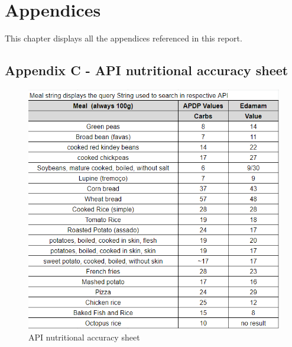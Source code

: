 %
%

\chapter{Appendices}

This chapter displays all the appendices referenced in this report.

\newpage

\appendix


\begin{landscape}
    \appendix
    
\end{landscape}

\appendix
\section*{Appendix C - API nutritional accuracy sheet}
\label{app:nutritional_sheet}
\begin{figure}[H] 
    \begin{center}
        \includegraphics[scale=1]{_figures/api_nutritional_accuracy.png}
        \caption{API nutritional accuracy sheet}
    \end{center}       
\end{figure}
